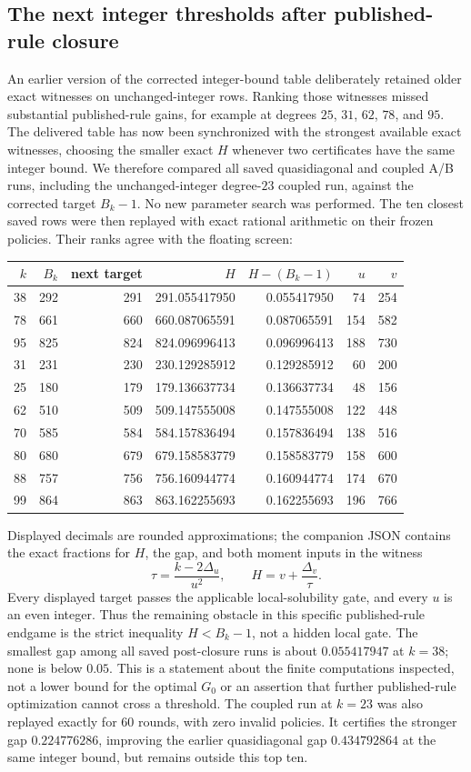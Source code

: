 \documentclass[11pt,letterpaper]{article}
\numberwithin{equation}{section}
\begin{document}
\subsection{The next integer thresholds after published-rule closure}
An earlier version of the corrected integer-bound table deliberately retained
older exact witnesses on unchanged-integer rows.  Ranking those witnesses
missed substantial published-rule gains, for example at degrees $25$, $31$,
$62$, $78$, and $95$.  The delivered table has now been synchronized with
the strongest available exact witnesses, choosing the smaller exact $H$
whenever two certificates have the same integer bound.
We therefore compared all saved quasidiagonal and coupled A/B runs, including
the unchanged-integer degree-$23$ coupled run, against the corrected target
$B_k-1$.  No new parameter search was performed.  The ten closest saved rows
were then replayed with exact rational arithmetic on their frozen policies.
Their ranks agree with the floating screen:
\begin{center}
\begin{tabular}{rrrrrrr}
$k$ & $B_k$ & next target & $H$ & $H-(B_k-1)$ & $u$ & $v$\\
\hline
38 & 292 & 291 & 291.055417950 & 0.055417950 & 74 & 254 \\
78 & 661 & 660 & 660.087065591 & 0.087065591 & 154 & 582 \\
95 & 825 & 824 & 824.096996413 & 0.096996413 & 188 & 730 \\
31 & 231 & 230 & 230.129285912 & 0.129285912 & 60 & 200 \\
25 & 180 & 179 & 179.136637734 & 0.136637734 & 48 & 156 \\
62 & 510 & 509 & 509.147555008 & 0.147555008 & 122 & 448 \\
70 & 585 & 584 & 584.157836494 & 0.157836494 & 138 & 516 \\
80 & 680 & 679 & 679.158583779 & 0.158583779 & 158 & 600 \\
88 & 757 & 756 & 756.160944774 & 0.160944774 & 174 & 670 \\
99 & 864 & 863 & 863.162255693 & 0.162255693 & 196 & 766 \\
\end{tabular}
\end{center}
Displayed decimals are rounded approximations; the companion JSON contains
the exact fractions for $H$, the gap, and both moment inputs in the witness
\[
 \tau=\frac{k-2\Delta_u}{u^2},\qquad H=v+\frac{\Delta_v}{\tau}.
\]
Every displayed target passes the applicable local-solubility gate, and every
$u$ is an even integer.  Thus the remaining obstacle in this specific
published-rule endgame is the strict inequality $H<B_k-1$, not a hidden
local gate.  The smallest gap among all saved post-closure runs is about
$0.055417947$ at $k=38$; none is below $0.05$.  This is a statement about
the finite computations inspected, not a lower bound for the optimal $G_0$
or an assertion that further published-rule optimization cannot cross a
threshold.  The coupled run at $k=23$ was also replayed exactly for 60 rounds,
with zero invalid policies.  It certifies the stronger gap
$0.224776286$, improving the earlier quasidiagonal gap $0.434792864$
at the same integer bound, but remains outside this top ten.
\end{document}
